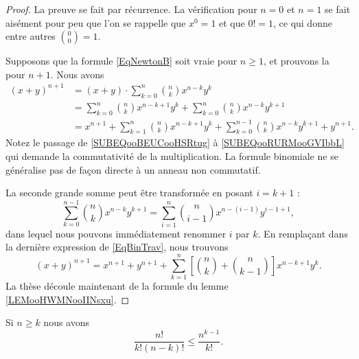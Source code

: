 \begin{proof}
	La preuve se fait par récurrence. La vérification pour \( n=0\) et \( n=1\) se fait aisément pour peu que l'on se rappelle que \( x^0=1\) et que \( 0!=1\), ce qui donne entre autres \( {0\choose 0}=1\).

	Supposons que la formule \eqref{EqNewtonB} soit vraie pour \( n\geq1\), et prouvons la pour \( n+1\). Nous avons
	\begin{subequations}\label{EqBinTrav}
		\begin{align}
			(x+y)^{n+1} & = (x+y)\cdot \sum_{k=0}^n{n\choose k}x^{n-k}y^k                                                  \label{SUBEQooBEUCooHSRtug}  \\
			            & = \sum_{k=0}^n{n\choose k}x^{n-k+1}y^k+\sum_{k=0}^n{n\choose k}x^{n-k}y^{k+1}                     \label{SUBEQooRURMooGVIbbL} \\
			            & = x^{n+1}+ \sum_{k=1}^n{n\choose k}x^{n-k+1}y^k+\sum_{k=0}^{n-1}{n\choose k}x^{n-k}y^{k+1}+y^{n+1}.
		\end{align}
	\end{subequations}
	Notez le passage de \eqref{SUBEQooBEUCooHSRtug} à \eqref{SUBEQooRURMooGVIbbL} qui demande la commutativité de la multiplication. La formule binomiale ne se généralise pas de façon directe à un anneau non commutatif.

	La seconde grande somme peut être transformée en posant \( i=k+1\) :
	\begin{equation}
		\sum_{k=0}^{n-1}{n\choose k}x^{n-k}y^{k+1} = \sum_{i=1}^n{n\choose i-1}x^{n-(i-1)}y^{i-1+1},
	\end{equation}
	dans lequel nous pouvons immédiatement renommer \( i\) par \( k\). En remplaçant dans la dernière expression de \eqref{EqBinTrav}, nous trouvons
	\begin{equation}
		(x+y)^{n+1}=x^{n+1}+y^{n+1}+\sum_{k=1}^n\left[ {n\choose k}+{n\choose k-1} \right]x^{n-k+1}y^k.
	\end{equation}
	La thèse découle maintenant de la formule du lemme \ref{LEMooHWMNooIINsxu}.
\end{proof}

\begin{lemma}        \label{LEMooLPCXooYIzJsD}
	Si \( n\geq k\) nous avons
	\begin{equation}
		\frac{ n! }{ k!(n-k)! }\leq \frac{ n^{k-1} }{ k! }.
	\end{equation}
\end{lemma}

